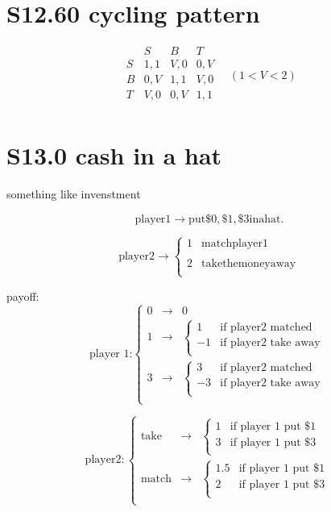 \documentclass[12pt,a4paper]{article}
\begin{document}
\section{S12.60 cycling pattern}
\[
\begin{array}{c|ccc}
 & S & B & T\\
 \hline
 S & 1,1 & V,0 & 0,V \\
 B & 0,V & 1,1 & V,0 \\
 T & V,0 & 0,V & 1,1 \\
\end{array}
\quad(1 < V < 2)
\]


\section{S13.0 cash in a hat}
something like invenstment

\[\mathrm{player1} \rightarrow \mathrm{put \$0, \$1, \$3 in a hat.}\]

 \[\mathrm{player2} \rightarrow \left\{ \begin{array}{cl}
1 & \mathrm{match player 1} \\
\\
2 & \mathrm{take the money away} \\
\end{array}\right.
\]

payoff:
\[ 
\text{player 1:} \left\{
\begin{array}{ccl}
0 & \rightarrow & 0 \\
1 & \rightarrow & \left\{\begin{array}{cl}
		1 & \text{if player2 matched} \\
		-1 & \text{if player2 take away}\\
	\end{array} \right.\\
3 & \rightarrow & \left\{\begin{array}{cl}
		3 & \text{if player2 matched} \\
		-3 & \text{if player2 take away}\\
	\end{array} \right.\\
\end{array}
\right.
\]

\[  \mathrm{player 2:} \left\{
\begin{array}{ccl}
\text{take} & \rightarrow &\left\{ \begin{array}{cl}
		1 & \text{if player 1 put \$1} \\
		3 & \text{if player 1 put \$3}\\
	\end{array} \right.\\
\text{match} & \rightarrow & \left\{ \begin{array}{cl}
		1.5 & \text{if player 1 put \$1} \\
		2 & \text{if player 1 put \$3}\\
	\end{array} \right.\\
\end{array}
\right.
\] 
\end{document}
